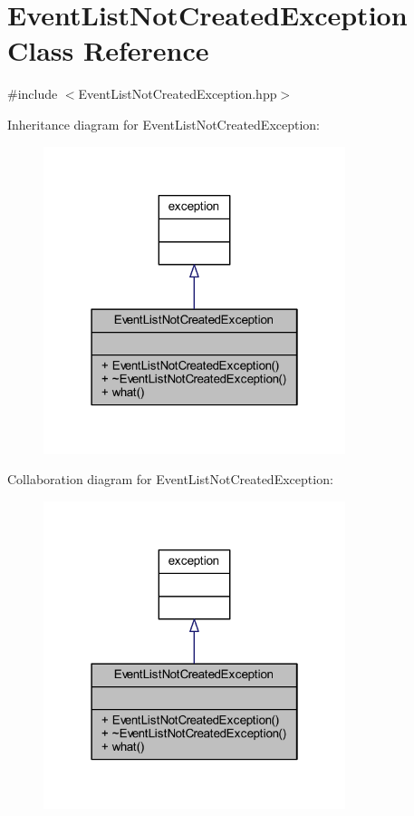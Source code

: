 \hypertarget{class_event_list_not_created_exception}{}\section{Event\+List\+Not\+Created\+Exception Class Reference}
\label{class_event_list_not_created_exception}


{\ttfamily \#include $<$Event\+List\+Not\+Created\+Exception.\+hpp$>$}



Inheritance diagram for Event\+List\+Not\+Created\+Exception\+:\nopagebreak
\begin{figure}[H]
\begin{center}
\leavevmode
\includegraphics[width=250pt]{class_event_list_not_created_exception__inherit__graph}
\end{center}
\end{figure}


Collaboration diagram for Event\+List\+Not\+Created\+Exception\+:\nopagebreak
\begin{figure}[H]
\begin{center}
\leavevmode
\includegraphics[width=250pt]{class_event_list_not_created_exception__coll__graph}
\end{center}
\end{figure}
